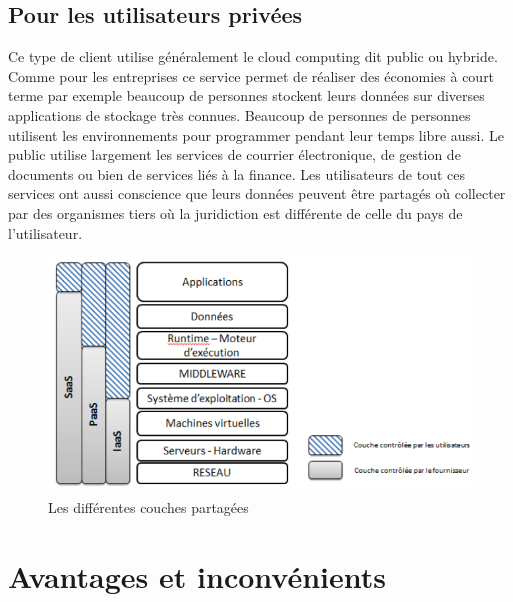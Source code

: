 \documentclass[a4 paper, 12 pt]{article}
\begin{document}
\subsection{Pour les utilisateurs privées}

Ce type de client utilise généralement le cloud computing dit public ou hybride. Comme pour les entreprises ce service permet de réaliser des économies à court terme par exemple beaucoup de personnes stockent leurs données sur diverses applications de stockage très connues. Beaucoup de personnes de personnes utilisent les environnements pour programmer pendant leur temps libre aussi. Le public utilise largement les services de courrier électronique, de gestion de documents ou bien de services liés à la finance. Les utilisateurs de tout ces services ont aussi conscience que leurs données peuvent être partagés où collecter par des organismes tiers où la juridiction est différente de celle du pays de l’utilisateur. 
 

 
\begin{figure} 
\includegraphics[scale=0.9]{CP1.png}
\caption{Les différentes couches partagées \cite{leon:tel-01138912}}
\label{2}
\end{figure}

\clearpage

\section{Avantages et inconvénients}
\end{document}
